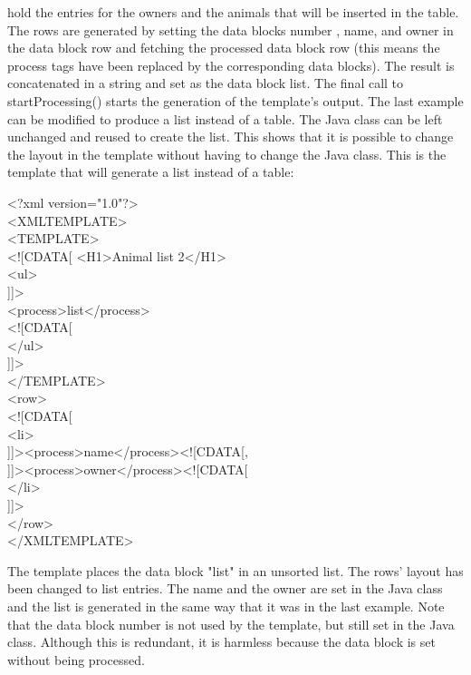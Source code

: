hold the entries for the owners and the animals that will be inserted
in the table. The rows are generated by setting the data blocks
{\name number} , {\name name}, and {\name owner} in the data block  {\name row} and fetching the
processed data block {\name row} (this means the process tags have been
replaced by the corresponding data blocks). The result is concatenated
in a string and set as the data block {\name list.} The final call to
{\code startProcessing()} starts the generation of the template's output.
The last example can be modified to produce a list instead of a table.
The Java class can be left unchanged and reused to create the list.
This shows that it is possible to change the layout in the template
without having to change the Java class. This is the template that will
generate a list instead of a table:

\begin{java}
<?xml version="1.0"?>\\
<XMLTEMPLATE>\\

<TEMPLATE>\\
<![CDATA[ <H1>Animal list 2</H1>\\
<ul>\\
\jtabb    ]]>\\
\jtabb    <process>list</process>\\
\jtabb    <![CDATA[\\
</ul>\\
]]>\\
</TEMPLATE>\\
<row>\\
<![CDATA[\\
<li>\\
]]><process>name</process><![CDATA[,\\
]]><process>owner</process><![CDATA[\\
</li>\\
]]>\\
</row>\\
</XMLTEMPLATE>\\
\end{java}

The template places the data block "list" in an unsorted list. The
rows' layout has been changed to list entries. The name and the owner
are set in the Java class and the list is generated in the same way
that it was in the last example. Note that the data block number is not
used by the template, but still set in the Java class. Although this is
redundant, it is harmless because the data block is set without being
processed.

